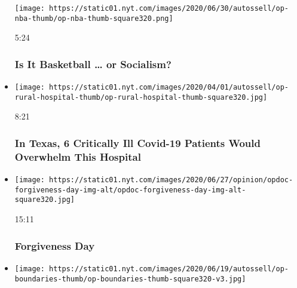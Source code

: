 \begin{itemize}
  \texttt{[image: https://static01.nyt.com/images/2020/06/30/autossell/op-nba-thumb/op-nba-thumb-square320.png]}

  5:24

  \hypertarget{is-it-basketball--or-socialism}{%
  \subsubsection{Is It Basketball \ldots{} or
  Socialism?}\label{is-it-basketball--or-socialism}}
\item
  \href{https://www.nytimes.com/video/opinion/100000007105817/coronavirus-texas-hospital.html?action=click\&module=video-series-bar\&region=header\&pgtype=Article\&playlistId=video/opinion}{}

  \texttt{[image: https://static01.nyt.com/images/2020/04/01/autossell/op-rural-hospital-thumb/op-rural-hospital-thumb-square320.jpg]}

  8:21

  \hypertarget{in-texas-6-critically-ill-covid-19-patients-would-overwhelm-this-hospital}{%
  \subsubsection{In Texas, 6 Critically Ill Covid-19 Patients Would
  Overwhelm This
  Hospital}\label{in-texas-6-critically-ill-covid-19-patients-would-overwhelm-this-hospital}}
\item
  \href{https://www.nytimes.com/video/opinion/100000007172575/forgiveness-day.html?action=click\&module=video-series-bar\&region=header\&pgtype=Article\&playlistId=video/opinion}{}

  \texttt{[image: https://static01.nyt.com/images/2020/06/27/opinion/opdoc-forgiveness-day-img-alt/opdoc-forgiveness-day-img-alt-square320.jpg]}

  15:11

  \hypertarget{forgiveness-day}{%
  \subsubsection{Forgiveness Day}\label{forgiveness-day}}
\item
  \href{https://www.nytimes.com/video/opinion/100000007184142/coronavirus-pandemic-parenting.html?action=click\&module=video-series-bar\&region=header\&pgtype=Article\&playlistId=video/opinion}{}

  \texttt{[image: https://static01.nyt.com/images/2020/06/19/autossell/op-boundaries-thumb/op-boundaries-thumb-square320-v3.jpg]}


\end{itemize}
